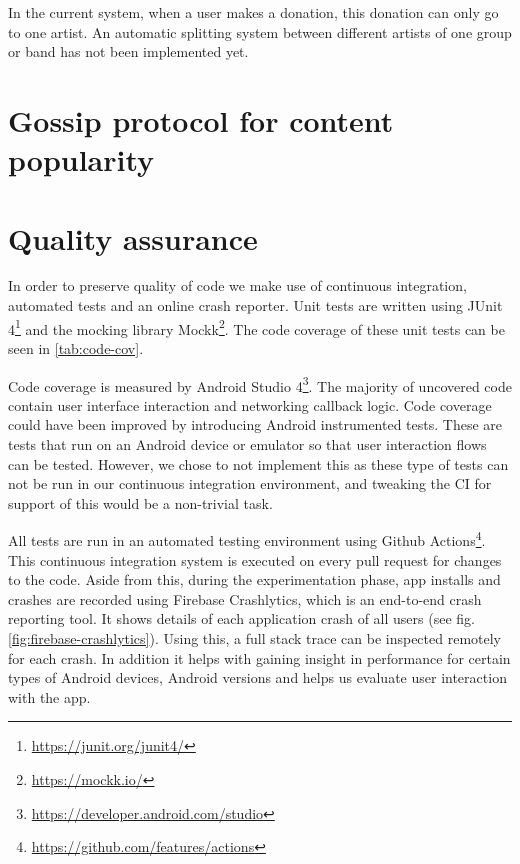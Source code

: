In the current system, when a user makes a donation, this donation can only go to one artist. An automatic splitting system between different artists of one group or band has not been implemented yet.

\section{Gossip protocol for content popularity}

\section{Quality assurance}
In order to preserve quality of code we make use of continuous integration, automated tests and an online crash reporter. Unit tests are written using JUnit 4\footnote{\url{https://junit.org/junit4/}} and the mocking library Mockk\footnote{\url{https://mockk.io/}}. The code coverage of these unit tests can be seen in \ref{tab:code-cov}. 

Code coverage is measured by Android Studio 4\footnote{\url{https://developer.android.com/studio}}. The majority of uncovered code contain user interface interaction and networking callback logic. Code coverage could have been improved by introducing Android instrumented tests. These are tests that run on an Android device or emulator so that user interaction flows can be tested. However, we chose to not implement this as these type of tests can not be run in our continuous integration environment, and tweaking the CI for support of this would be a non-trivial task.

All tests are run in an automated testing environment using Github Actions\footnote{\url{https://github.com/features/actions}}. This continuous integration system is executed on every pull request for changes to the code. Aside from this, during the experimentation phase, app installs and crashes are recorded using Firebase Crashlytics, which is an end-to-end crash reporting tool. It shows details of each application crash of all users (see fig. \ref{fig:firebase-crashlytics}). Using this, a full stack trace can be inspected remotely for each crash. In addition it helps with gaining insight in performance for certain types of Android devices, Android versions and helps us evaluate user interaction with the app.


